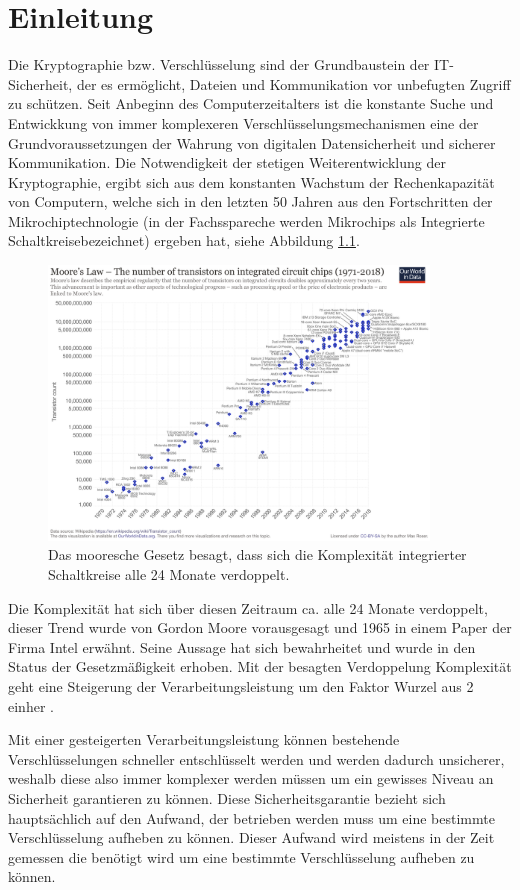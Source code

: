 \chapter{Einleitung}

Die Kryptographie bzw. Verschlüsselung sind der Grundbaustein der IT-Sicherheit, der es ermöglicht, Dateien und Kommunikation vor unbefugten Zugriff zu schützen.
Seit Anbeginn des Computerzeitalters ist die konstante Suche und Entwickkung von immer komplexeren Verschlüsselungsmechanismen eine der Grundvoraussetzungen der Wahrung von digitalen Datensicherheit und sicherer Kommunikation. Die Notwendigkeit der stetigen Weiterentwicklung der Kryptographie, ergibt sich aus dem konstanten Wachstum der Rechenkapazität von Computern, welche sich in den letzten 50 Jahren aus den Fortschritten der Mikrochiptechnologie (in der Fachsspareche werden Mikrochips als Integrierte Schaltkreisebezeichnet) ergeben hat, siehe Abbildung \ref{fig:Bild0}.
\begin{figure}[htbp] 
  \centering
     \includegraphics[width=0.9\textwidth]{img/Moores.png}
     \caption{Das mooresche Gesetz besagt, dass sich die Komplexität integrierter Schaltkreise alle 24 Monate verdoppelt.}
  \label{fig:Bild0}
\end{figure}
Die Komplexität hat sich über diesen Zeitraum ca. alle 24 Monate verdoppelt, dieser Trend wurde von Gordon Moore vorausgesagt und 1965 in einem Paper der Firma Intel erwähnt. Seine Aussage hat sich bewahrheitet und wurde in den Status der Gesetzmäßigkeit erhoben.
Mit der besagten Verdoppelung Komplexität geht eine Steigerung der Verarbeitungsleistung um den Faktor Wurzel aus 2 einher \cite{Intel}.

Mit einer gesteigerten Verarbeitungsleistung können bestehende Verschlüsselungen schneller entschlüsselt werden und werden dadurch unsicherer, weshalb diese also immer komplexer werden müssen um ein gewisses Niveau an Sicherheit garantieren zu können.
Diese Sicherheitsgarantie bezieht sich hauptsächlich auf den Aufwand, der betrieben werden muss um eine bestimmte Verschlüsselung aufheben zu können. Dieser Aufwand wird meistens in der Zeit gemessen die benötigt wird um eine bestimmte Verschlüsselung aufheben zu können.

